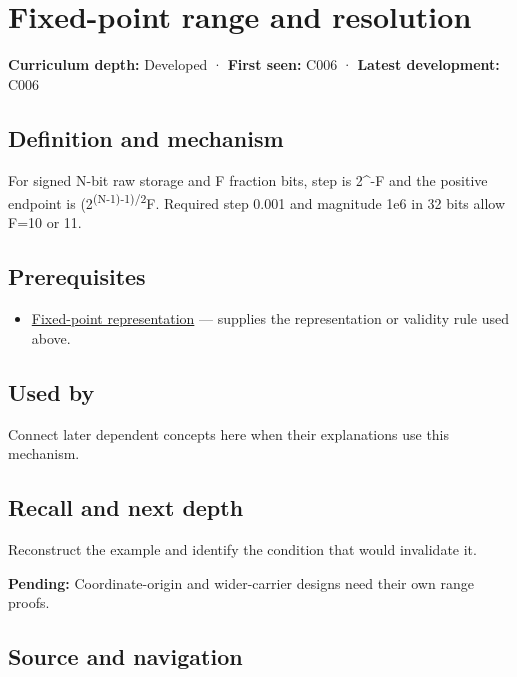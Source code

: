 \hypertarget{appendix-ceb4c4a9b5a1}{}
\section{Fixed-point range and resolution}\label{appendix-ceb4c4a9b5a1-fixed-point-range-and-resolution}

\textbf{Curriculum depth:} Developed · \textbf{First seen:} C006 · \textbf{Latest development:} C006

\subsection{Definition and mechanism}\label{appendix-ceb4c4a9b5a1-definition-and-mechanism}

For signed N-bit raw storage and F fraction bits, step is 2\^{}-F and the positive endpoint is (2\textsuperscript{(N-1)-1)/2}F. Required step 0.001 and magnitude 1e6 in 32 bits allow F=10 or 11.

\subsection{Prerequisites}\label{appendix-ceb4c4a9b5a1-prerequisites}

\begin{itemize}
\tightlist
\item
  \hyperref[appendix-1d0dbe8924cc]{Fixed-point representation} --- supplies the representation or validity rule used above.
\end{itemize}

\subsection{Used by}\label{appendix-ceb4c4a9b5a1-used-by}

Connect later dependent concepts here when their explanations use this mechanism.

\subsection{Recall and next depth}\label{appendix-ceb4c4a9b5a1-recall-and-next-depth}

Reconstruct the example and identify the condition that would invalidate it.

\textbf{Pending:} Coordinate-origin and wider-carrier designs need their own range proofs.

\subsection{Source and navigation}\label{appendix-ceb4c4a9b5a1-source-and-navigation}

